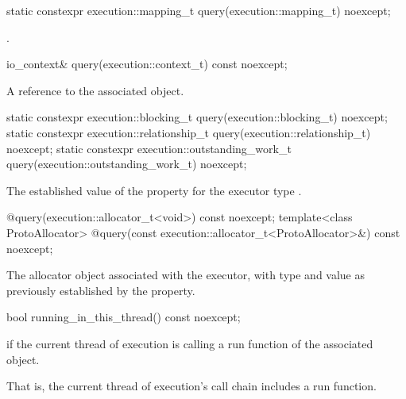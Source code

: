 \begin{itemdecl}
static constexpr execution::mapping_t query(execution::mapping_t) noexcept;
\end{itemdecl}

\begin{itemdescr}
\pnum
\returns {}.
\end{itemdescr}

\begin{itemdecl}
io_context& query(execution::context_t) const noexcept;
\end{itemdecl}

\begin{itemdescr}
\pnum
\returns A reference to the associated  object.
\end{itemdescr}

\begin{itemdecl}
static constexpr execution::blocking_t query(execution::blocking_t) noexcept;
static constexpr execution::relationship_t query(execution::relationship_t) noexcept;
static constexpr execution::outstanding_work_t query(execution::outstanding_work_t) noexcept;
\end{itemdecl}

\begin{itemdescr}
\returns The established value of the property for the executor type .
\end{itemdescr}

\begin{itemdecl}
@\seebelow@ query(execution::allocator_t<void>) const noexcept;
template<class ProtoAllocator>
  @\seebelow@ query(const execution::allocator_t<ProtoAllocator>&) const noexcept;
\end{itemdecl}

\begin{itemdescr}
\pnum
\returns The allocator object associated with the executor, with type and value as previously established by the  property.
\end{itemdescr}

%
\begin{itemdecl}
bool running_in_this_thread() const noexcept;
\end{itemdecl}

\begin{itemdescr}
\pnum
\returns {} if the current thread of execution is calling a run function of the associated  object. \begin{note} That is, the current thread of execution's call chain includes a run function. \end{note}
\end{itemdescr}

